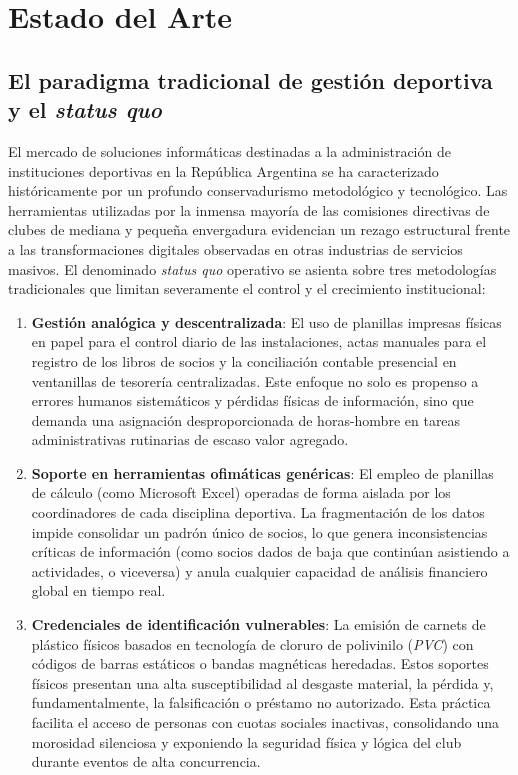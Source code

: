 \documentclass[conference, a4paper]{IEEEtran}
\begin{document}
\section{Estado del Arte}

\subsection{El paradigma tradicional de gesti\'on deportiva y el \textit{status quo}}
El mercado de soluciones inform\'aticas destinadas a la administraci\'on de instituciones deportivas en la Rep\'ublica Argentina se ha caracterizado hist\'oricamente por un profundo conservadurismo metodol\'ogico y tecnol\'ogico. Las herramientas utilizadas por la inmensa mayor\'ia de las comisiones directivas de clubes de mediana y peque\~na envergadura evidencian un rezago estructural frente a las transformaciones digitales observadas en otras industrias de servicios masivos. El denominado \textit{status quo} operativo se asienta sobre tres metodolog\'ias tradicionales que limitan severamente el control y el crecimiento institucional:

\begin{enumerate}
    \item \textbf{Gesti\'on anal\'ogica y descentralizada}: El uso de planillas impresas f\'isicas en papel para el control diario de las instalaciones, actas manuales para el registro de los libros de socios y la conciliaci\'on contable presencial en ventanillas de tesorer\'ia centralizadas. Este enfoque no solo es propenso a errores humanos sistem\'aticos y p\'erdidas f\'isicas de informaci\'on, sino que demanda una asignaci\'on desproporcionada de horas-hombre en tareas administrativas rutinarias de escaso valor agregado.
    \item \textbf{Soporte en herramientas ofim\'aticas gen\'ericas}: El empleo de planillas de c\'alculo (como Microsoft Excel) operadas de forma aislada por los coordinadores de cada disciplina deportiva. La fragmentaci\'on de los datos impide consolidar un padr\'on \'unico de socios, lo que genera inconsistencias cr\'iticas de informaci\'on (como socios dados de baja que contin\'uan asistiendo a actividades, o viceversa) y anula cualquier capacidad de an\'alisis financiero global en tiempo real.
    \item \textbf{Credenciales de identificaci\'on vulnerables}: La emisi\'on de carnets de pl\'astico f\'isicos basados en tecnolog\'ia de cloruro de polivinilo (\textit{PVC}) con c\'odigos de barras est\'aticos o bandas magn\'eticas heredadas. Estos soportes f\'isicos presentan una alta susceptibilidad al desgaste material, la p\'erdida y, fundamentalmente, la falsificaci\'on o pr\'estamo no autorizado. Esta pr\'actica facilita el acceso de personas con cuotas sociales inactivas, consolidando una morosidad silenciosa y exponiendo la seguridad f\'isica y l\'ogica del club durante eventos de alta concurrencia.
\end{enumerate}
\end{document}
